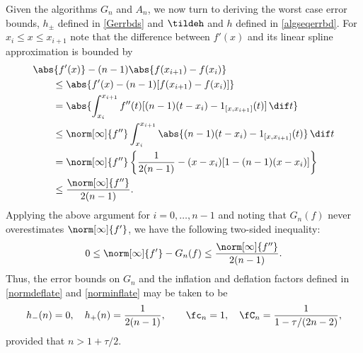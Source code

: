 Given the algorithms $G_n$ and $A_n$, we now turn to deriving the worst case error bounds, $h_{\pm}$ defined in \eqref{Gerrbds} and $\tildeh$ and $h$ defined in \eqref{algseqerrbd}.  For $x_{i} \le x \le x_{i+1}$ note that the difference between $f'(x)$ and its linear spline approximation is bounded by
\begin{align*}
\MoveEqLeft{\abs{f'(x)} - (n-1) \abs{f(x_{i+1})-f(x_i)}} \\
 & \le \abs{f'(x) - (n-1)[f(x_{i+1})-f(x_i)]} \\
&=\abs{ \int_{x_i}^{x_{i+1}} f''(t) [(n-1)(t-x_i) -  1_{[x,x_{i+1}]}(t)] \, \dif t} \\
& \le \norm[\infty]{f''} \int_{x_i}^{x_{i+1}} \abs{  (n-1)(t-x_i) -  1_{[x,x_{i+1}]}(t)} \, \dif t \\
&=\norm[\infty]{f''} \left \{\frac{1}{2(n-1)} - (x-x_i)[1-(n-1)(x-x_i)] \right\} \\
&\le \frac{\norm[\infty]{f''}}{2(n-1)}.
\end{align*}
Applying the above argument for $i=0, \ldots, n-1$ and noting that $G_n(f)$ never overestimates $\norm[\infty]{f'}$, we have the following two-sided inequality:
\[
0 \le \norm[\infty]{f'} - G_n(f) \le \frac{\norm[\infty]{f''}}{2(n-1)}.
\]
Thus, the error bounds on $G_n$ and the inflation and deflation factors defined in  \eqref{normdeflate} and \eqref{norminflate} may be taken to be
\begin{equation}\label{inflaapprox}
 h_{-}(n)=0, \quad h_{+}(n)=\frac{1}{2(n-1)}, \qquad \fc_n=1, \quad   \fC_n =\frac{1}{1 - \tau /(2n-2)},
\end{equation}
provided that $n>1+\tau/2$.

